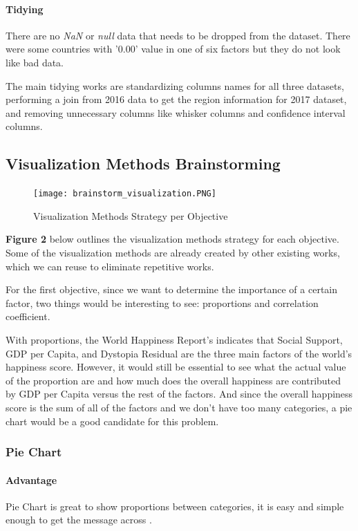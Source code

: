 \documentclass[11pt,twocolumn]{article}
\begin{document}
\paragraph{Tidying} There are no \textit{NaN} or \textit{null} data that needs to be dropped from the dataset. There were some countries with '0.00' value in one of six factors but they do not look like bad data.

The main tidying works are standardizing columns names for all three datasets, performing a join from 2016 data to get the region information for 2017 dataset, and removing unnecessary columns like whisker columns and confidence interval columns.

\subsection{Visualization Methods Brainstorming}

\begin{figure}[hbt!]
\texttt{[image: brainstorm\_visualization.PNG]} 
\caption{Visualization Methods Strategy per Objective}
\end{figure}

\textbf{Figure 2} below outlines the visualization methods strategy for each objective. Some of the visualization methods are already created by other existing works, which we can reuse to eliminate repetitive works.

For the first objective, since we want to determine the importance of a certain factor, two things would be interesting to see: proportions and correlation coefficient. 

With proportions, the World Happiness Report's indicates that Social Support, GDP per Capita, and Dystopia Residual are the three main factors of the world's happiness score. However, it would still be essential to see what the actual value of the proportion are and how much does the overall happiness are contributed by GDP per Capita versus the rest of the factors. And since the overall happiness score is the sum of all of the factors and we don't have too many categories, a pie chart would be a good candidate for this problem. 

\subsubsection{Pie Chart} 
\paragraph{Advantage} Pie Chart is great to show proportions between categories, it is easy and simple enough to get the message across \cite{piechart}. 
\end{document}
